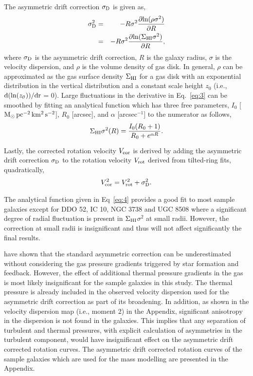 \documentclass[natbib209]{emulateapj}
\begin{document}
The asymmetric drift correction $\sigma_{\rm D}$ is given as,
\begin{eqnarray}
\label{eq:3}
\sigma^{2}_{\rm D} &=& -R\sigma^{2}\frac{\partial\rm ln(\rho
\sigma^{2})}{\partial R} \nonumber \\
&=& -R\sigma^{2}\frac{\partial\rm ln(\Sigma_{\rm HI} \sigma^{2})}{\partial R},
\end{eqnarray}
\noindent where $\sigma_{\rm D}$ is the asymmetric drift correction, $R$ is the
galaxy radius, $\sigma$ is the velocity dispersion, and $\rho$ is the volume
density of gas disk. In general, $\rho$ can be approximated as the gas surface
density $\Sigma_{\rm HI}$ for a gas disk with an exponential distribution in the vertical
distribution and a constant scale height $z_{0}$ (i.e., $\rm d(ln({\it
z_{0}}))/\rm dr$ = 0). Large fluctuations in the derivative in Eq.~\ref{eq:3}
can be smoothed by fitting an analytical function which has three free parameters,
$I_{0}$ [$\rm M_{\odot}\,{pc}^{-2}\,km^{2}\,s^{-2}$], $R_{0}$ [arcsec], and
$\alpha$ [arcsec$^{-1}$] to the numerator as follows,
\begin{eqnarray}
\label{eq:4}
\Sigma_{\rm HI}\sigma^{2}(R) = \frac{I_{0}(R_{0}+1)}{R_{0}+e^{\alpha R}}.
\end{eqnarray}

Lastly, the corrected rotation velocity $V_{\rm cor}$ is
derived by adding the asymmetric drift correction $\sigma_{\rm D}$ to the
rotation velocity $V_{\rm rot}$ derived from tilted-ring fits,
quadratically,
\begin{eqnarray}
\label{eq:5}
V^{2}_{\rm cor} = V^{2}_{\rm rot} + \sigma^{2}_{\rm D}.
\end{eqnarray}

The analytical function given in Eq~\ref{eq:4} provides a good fit to most sample
galaxies except for DDO 52, IC 10, NGC 3738 and UGC 8508 where a significant
degree of radial fluctuation is present in $\Sigma_{\rm HI}$$\sigma^{2}$ at small radii.
However, the correction at small radii is insignificant and thus will not affect
significantly the final results. 

\cite{2007ApJ...657..773V} have shown that the standard asymmetric correction
can be underestimated without considering the gas pressure gradients triggered
by star formation and feedback. However, the effect of additional thermal pressure gradients in the gas is most likely
insignificant for the sample galaxies in this study. The thermal pressure is
already included in the observed velocity dispersion used for the asymmetric
drift correction as part of its broadening. In addition, as shown in the
velocity dispersion map (i.e., moment 2) in the Appendix, significant anisotropy
in the dispersion is not found in the galaxies. This implies that any separation
of turbulent and thermal pressures, with explicit calculation of asymmetries in
the turbulent component, would have insignificant effect on the asymmetric drift
corrected rotation curves. The asymmetric drift corrected rotation curves
of the sample galaxies which are used for the mass modelling are presented in
the Appendix.
\end{document}
